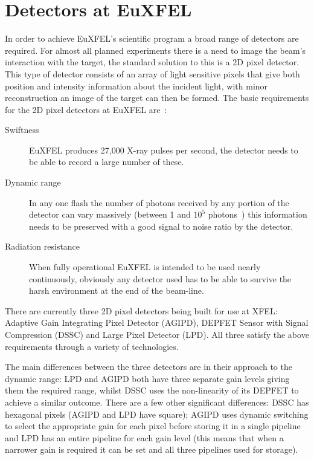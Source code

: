 \section{Detectors at EuXFEL} %
\label{sub:detectors_at_euxfel}
In order to achieve EuXFEL's scientific program a broad range of detectors are required. For almost all planned experiments there is a need to image the beam's interaction with the target, the standard solution to this is a 2D pixel detector. This type of detector consists of an array of light sensitive pixels that give both position and intensity information about the incident light, with minor reconstruction an image of the target can then be formed. The basic requirements for the 2D pixel detectors at EuXFEL are~\cite{xfel_website}:
\begin{description}
    \item[Swiftness] EuXFEL produces 27,000 X-ray pulses per second, the detector needs to be able to record a large number of these.
    \item[Dynamic range] In any one flash the number of photons received by any portion of the detector can vary massively (between 1 and \(10^5\) photons~\cite{lpd_manual}) this information needs to be preserved with a good signal to noise ratio by the detector.
    \item[Radiation resistance] When fully operational EuXFEL is intended to be used nearly continuously, obviously any detector used has to be able to survive the harsh environment at the end of the beam-line.
\end{description}

There are currently three 2D pixel detectors being built for use at XFEL: Adaptive Gain Integrating Pixel Detector (AGIPD), DEPFET Sensor with Signal Compression (DSSC) and Large Pixel Detector (LPD). All three satisfy the above requirements through a variety of technologies.

The main differences between the three detectors are in their approach to the dynamic range: LPD and AGIPD both have three separate gain levels giving them the required range, whilst DSSC uses the non-linearity of its DEPFET to achieve a similar outcome. There are a few other significant differences: DSSC has hexagonal pixels (AGIPD and LPD have square); AGIPD uses dynamic switching to select the appropriate gain for each pixel before storing it in a single pipeline and LPD has an entire pipeline for each gain level (this means that when a narrower gain is required it can be set and all three pipelines used for storage). 

